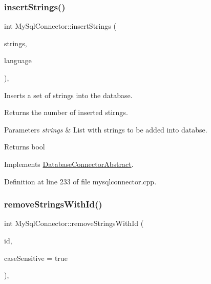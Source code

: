 \subsubsection{\texorpdfstring{insert\+Strings()}{insertStrings()}}
{\footnotesize\ttfamily int My\+Sql\+Connector\+::insert\+Strings (\begin{DoxyParamCaption}\item[{const Q\+List$<$ \mbox{\hyperlink{classString}{String}} $\ast$$>$ \&}]{strings,  }\item[{const Q\+String}]{language }\end{DoxyParamCaption})\hspace{0.3cm}{\ttfamily [override]}, {\ttfamily [virtual]}}



Inserts a set of strings into the database. 

Returns the number of inserted stirngs. 
\begin{DoxyParams}{Parameters}
{\em strings} & List with strings to be added into databse. \\
\hline
\end{DoxyParams}
\begin{DoxyReturn}{Returns}
bool 
\end{DoxyReturn}


Implements \mbox{\hyperlink{classDatabaseConnectorAbstract_a0e8c94cf0b38c797d6feef864a23347b}{Database\+Connector\+Abstract}}.



Definition at line 233 of file mysqlconnector.\+cpp.

\mbox{\label{classMySqlConnector_a3c340e5310c56410d64ecd89e5cf6661}} 
\subsubsection{\texorpdfstring{remove\+Strings\+With\+Id()}{removeStringsWithId()}}
{\footnotesize\ttfamily int My\+Sql\+Connector\+::remove\+Strings\+With\+Id (\begin{DoxyParamCaption}\item[{const Q\+String \&}]{id,  }\item[{bool}]{case\+Sensitive = {\ttfamily true} }\end{DoxyParamCaption})\hspace{0.3cm}{\ttfamily [override]}, {\ttfamily [virtual]}}



